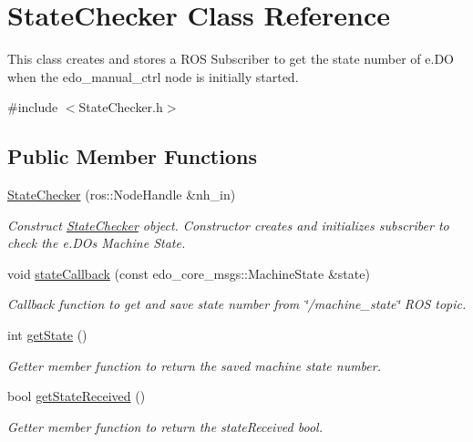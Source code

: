 \hypertarget{classStateChecker}{}\section{State\+Checker Class Reference}
\label{classStateChecker}


This class creates and stores a R\+OS Subscriber to get the state number of e.\+DO when the edo\+\_\+manual\+\_\+ctrl node is initially started.  




{\ttfamily \#include $<$State\+Checker.\+h$>$}

\subsection*{Public Member Functions}
\begin{DoxyCompactItemize}
\item 
\hyperlink{classStateChecker_af833704c06a5bf3ed0dbeac79647a467}{State\+Checker} (ros\+::\+Node\+Handle \&nh\+\_\+in)
\begin{DoxyCompactList}\small\item\em Construct \hyperlink{classStateChecker}{State\+Checker} object. Constructor creates and initializes subscriber to check the e.\+DO\textquotesingle{}s Machine State. \end{DoxyCompactList}\item 
void \hyperlink{classStateChecker_a5817a8be3dfba3f1cae465785475d6b0}{state\+Callback} (const edo\+\_\+core\+\_\+msgs\+::\+Machine\+State \&state)
\begin{DoxyCompactList}\small\item\em Callback function to get and save state number from \char`\"{}/machine\+\_\+state\char`\"{} R\+OS topic. \end{DoxyCompactList}\item 
int \hyperlink{classStateChecker_aef02374888e148c8bd99f175a73731b8}{get\+State} ()
\begin{DoxyCompactList}\small\item\em Getter member function to return the saved machine state number. \end{DoxyCompactList}\item 
bool \hyperlink{classStateChecker_a83de0c83302c06d0a10b358a6e734150}{get\+State\+Received} ()
\begin{DoxyCompactList}\small\item\em Getter member function to return the state\+Received bool. \end{DoxyCompactList}\end{DoxyCompactItemize}



